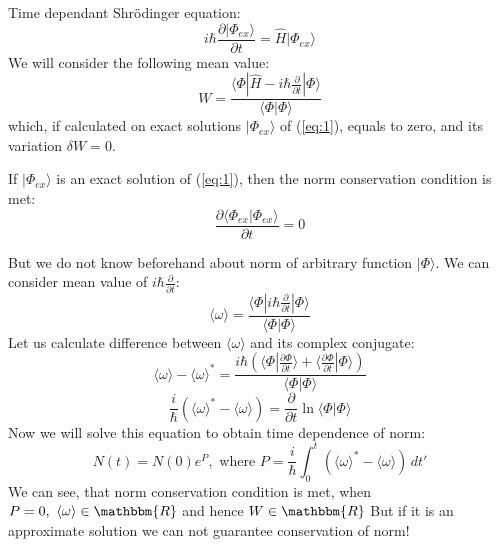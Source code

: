 Time dependant Shr\"{o}dinger equation:
\begin{equation}
i\hbar\frac{\partial |\Phi_{ex}\rangle}{\partial t} = \hat{H}|\Phi_{ex}\rangle
\label{eq:1}
\end{equation}
We will consider the following mean value:
$$W=\frac{ \langle \Phi| \hat{H} - i\hbar\frac{\partial}{\partial t} | \Phi \rangle }{\langle\Phi|\Phi\rangle}$$
which, if calculated on exact solutions $|\Phi_{ex}\rangle$ of (\ref{eq:1}), equals to zero, and its variation $\delta W = 0$.

If $|\Phi_{ex}\rangle$ is an exact solution of (\ref{eq:1}), then the norm conservation condition is met:
$$\frac{\partial \langle\Phi_{ex}|\Phi_{ex}\rangle }{\partial t} = 0$$

But we do not know beforehand about norm of arbitrary function $|\Phi\rangle$.
We can consider mean value of $i\hbar\frac{\partial}{\partial t}$:
$$\langle\omega\rangle = \frac{ \langle \Phi | i\hbar\frac{\partial}{\partial t} | \Phi \rangle }{\langle\Phi|\Phi\rangle}$$
Let us calculate difference between $\langle\omega\rangle$ and its complex conjugate:
$$\langle\omega\rangle-\langle\omega\rangle^* = \frac{i\hbar( \langle\Phi|\frac{\partial \Phi}{\partial t}\rangle + %
							      \langle\frac{\partial \Phi}{\partial t}|\Phi\rangle )}%
						     {\langle\Phi|\Phi\rangle}$$
$$\frac{i}{\hbar}\left(\langle\omega\rangle^*-\langle\omega\rangle\right) = \frac{\partial}{\partial t}\ln\langle\Phi|\Phi\rangle$$
Now we will solve this equation to obtain time dependence of norm:
$$N(t) = N(0)e^P,\text{ where } P = \frac{i}{\hbar}\int_0^t\left(\langle\omega\rangle^*-\langle\omega\rangle\right)\,dt'$$
We can see, that norm conservation condition is met, when $P=0,\ \langle\omega\rangle\in\mathbbm{R}$ and hence $W\in\mathbbm{R}$
But if it is an approximate solution we can not guarantee conservation of norm!

